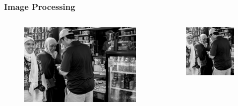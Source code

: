 \documentclass{beamer}
\begin{document}
\begin{frame}[fragile]
  \frametitle{Image Processing}

	\begin{columns}
	\begin{column}{.32\textwidth}
	\begin{figure}
	  \includegraphics[width=\textwidth,height=0.45\textheight]{20441017631[1]}
	\end{figure}
	\end{column}
	\begin{column}{.32\textwidth}
	\begin{figure}
	  \includegraphics[width=\textwidth,height=0.45\textheight]{20441017631[2]}

\end{figure}
\end{column}
\end{columns}
\end{frame}
\end{document}
